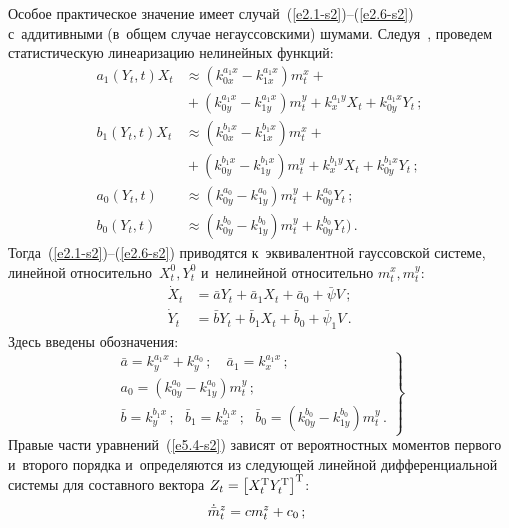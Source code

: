 \begin{multicols}{2}
Особое практическое значение имеет случай~(\ref{e2.1-s2})--(\ref{e2.6-s2}) 
с~аддитивными (в~общем случае негауссовскими) шумами.
Следуя~\cite{3-s2}, проведем статистическую линеаризацию нелинейных функций:
\begin{align*}
a_1 \left(Y_t, t\right) X_t &\approx 
\left(k_{0x}^{a_1 x} - k_{1x}^{a_1 x}\right) m_t^x +{}\\
&{}+ \left( k_{0y}^{a_1 x} - k_{1y}^{a_1 x}\right) m_t^y + 
k_x^{a_1 y} X_t + k_{0y}^{a_1 x} Y_t\,;\\
b_1 \left(Y_t, t\right) X_t &\approx 
\left(k_{0x}^{b_1 x} - k_{1x}^{b_1 x}\right) m_t^x +{}\\
&{}+ \left( k_{0y}^{b_1 x} - k_{1y}^{b_1 x}\right) m_t^y + 
k_x^{b_1 y} X_t + k_{0y}^{b_1 x} Y_t\,;\\
a_0 \left(Y_t , t\right) &\approx
\left( k_{0y}^{a_0} - k_{1y}^{a_0}\right) m_t^y +
 k_{0y}^{a_0} Y_t\,; \\
b_0 \left(Y_t , t\right) &\approx \left( k_{0y}^{b_0} - k_{1y}^{b_0}\right) m_t^y + 
k_{0y}^{b_0} Y_t)\,.
\end{align*}
Тогда~(\ref{e2.1-s2})--(\ref{e2.6-s2}) приводятся к~эквивалентной 
гауссовской системе,
линейной относительно~$X_t^0, Y_t^0$ и~нелинейной относительно
$m_t^x, m_t^y$:
    \begin{align*}
    \dot X_t &= \bar a Y_t + \bar a_1 X_t + \bar a_0 +\bar\psi V\,;
    \\
\dot Y_t &= \bar b Y_t + \bar b_1 X_t + \bar b_0 +\bar\psi_1 V\,.
\end{align*}
Здесь введены обозначения:
    \begin{equation}
    \left.
    \begin{array}{c}
    \bar a = k_y^{a_1x} + k_y^{a_0}\,; \quad 
    \bar a_1 = k_x^{a_1 x}\,;\\[4pt]
    a_0 = (k_{0y}^{a_0} - k_{1y}^{a_0}) m_t^y\,;\\[4pt]
\bar b = k_y^{b_1x}\,; \ \ \ \bar b_1 = k_x^{b_1 x}\,;\ \ \ \bar b_0 = (k_{0y}^{b_0} - k_{1y}^{b_0}) m_t^y\,.
\end{array}
\right\}
\label{e5.4-s2}
\end{equation}
Правые части уравнений~(\ref{e5.4-s2}) 
зависят от вероятностных моментов первого и~второго порядка и~определяются 
из следующей линейной дифференциальной системы для составного вектора  
$Z_t \hm=\lk X_t^{\mathrm{T}} Y_t^{\mathrm{T}}\rk^{\mathrm{T}}$:
\begin{equation}
\dot{\bar m}_t^z = cm_t^z + c_0\,;\enskip

\end{equation}
\end{multicols}
